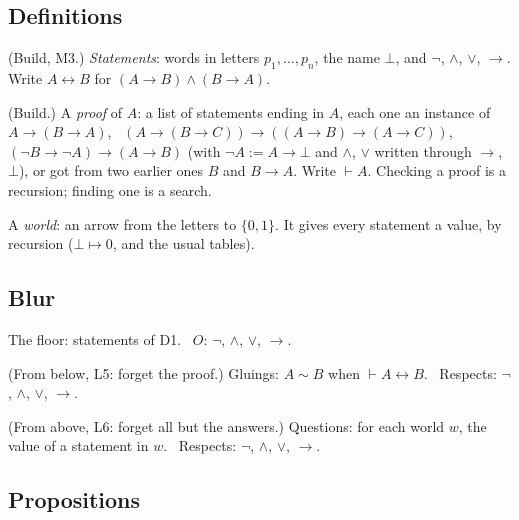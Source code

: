 \subsection*{Definitions}

\begin{lines}
\item[\lab{D1}] (Build, M3.) \emph{Statements}: words in letters $p_1, \dots, p_n$, the name $\bot$, and $\neg$, $\wedge$, $\vee$, $\to$. Write $A \leftrightarrow B$ for $(A \to B) \wedge (B \to A)$.
\item[\lab{D2}] (Build.) A \emph{proof} of $A$: a list of statements ending in $A$, each one an instance of $A \to (B \to A)$, \ $(A \to (B \to C)) \to ((A \to B) \to (A \to C))$, \ $(\neg B \to \neg A) \to (A \to B)$ (with $\neg A := A \to \bot$ and $\wedge$, $\vee$ written through $\to$, $\bot$), or got from two earlier ones $B$ and $B \to A$. Write $\vdash A$. Checking a proof is a recursion; finding one is a search.
\item[\lab{D3}] A \emph{world}: an arrow from the letters to $\{0, 1\}$. It gives every statement a value, by recursion ($\bot \mapsto 0$, and the usual tables).
\end{lines}

\subsection*{Blur}

The floor: statements of D1. \ $O$: $\neg$, $\wedge$, $\vee$, $\to$.

\begin{lines}
\item[\lab{B1}] (From below, L5: forget the proof.) Gluings: $A \sim B$ when $\vdash A \leftrightarrow B$. \ Respects: $\neg$, $\wedge$, $\vee$, $\to$.
\item[\lab{B2}] (From above, L6: forget all but the answers.) Questions: for each world $w$, the value of a statement in $w$. \ Respects: $\neg$, $\wedge$, $\vee$, $\to$.
\end{lines}

\subsection*{Propositions}

